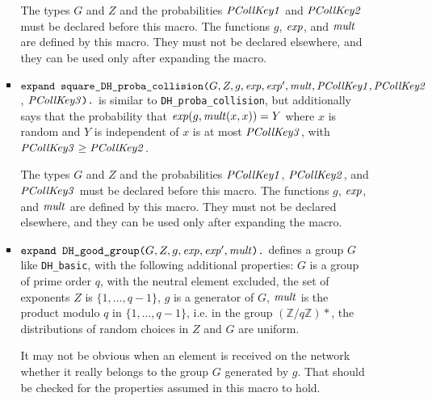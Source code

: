 \documentclass{article}
\begin{document}
\begin{itemize}
\begin{itemize}
\begin{itemize}
       The types $G$ and $Z$ and the probabilities $\mathit{PCollKey1}$
       and $\mathit{PCollKey2}$ must be declared before this macro.  The
       functions $g$, $\mathit{exp}$, and $\mathit{mult}$ are defined by this
       macro. They must not be declared elsewhere, and they can be
       used only after expanding the macro.

     \item $\texttt{expand\ square\_DH\_proba\_collision(}G, Z, g, \vn{exp},
       \vn{exp}', \vn{mult}, \vn{PCollKey1},
       \vn{PCollKey2}$, $\mathit{PCollKey3}\texttt{).}$ is similar to \texttt{DH\_proba\_collision}, but additionally
   says that the probability that $\mathit{exp}(g, \mathit{mult}(x,x)) = Y$ where
   $x$ is random and $Y$ is independent of $x$ is at most $\mathit{PCollKey3}$, with $\mathit{PCollKey3} \geq \mathit{PCollKey2}$.
       
       The types $G$ and $Z$ and the probabilities $\mathit{PCollKey1}$, $\mathit{PCollKey2}$, 
       and $\mathit{PCollKey3}$ must be declared before this macro.  The
       functions $g$, $\mathit{exp}$, and $\mathit{mult}$ are defined by this
       macro. They must not be declared elsewhere, and they can be
       used only after expanding the macro.

     \item $\texttt{expand\ DH\_good\_group(}G, Z, g, \mathit{exp}, \mathit{exp}', \mathit{mult}\texttt{).}$ defines a group $G$ like
       \texttt{DH\_basic}, with the following additional properties:
       $G$ is a group of prime order $q$, with the neutral element excluded, 
       the set of exponents $Z$ is $\{1, \dots, q-1\}$,
       $g$ is a generator of $G$, 
       $\mathit{mult}$ is the product modulo $q$ in $\{1, \dots, q-1\}$, i.e. in the group $(\mathbb{Z}/q\mathbb{Z})*$,
       the distributions of random choices in $Z$ and $G$ are uniform.

       It may not be obvious when an element is received on the network
       whether it really belongs to the group $G$ generated by $g$. That should 
       be checked for the properties assumed in this macro to hold.


\end{itemize}
\end{itemize}
\end{itemize}
\end{document}

